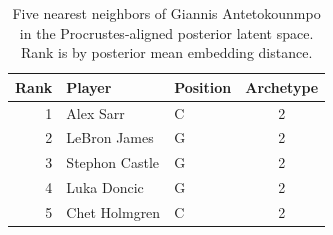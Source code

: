 \begin{table}[htbp]
  \centering\small
  \begin{tabular}{rllc}
    \toprule
    Rank & Player & Position & Archetype \\
    \midrule
    1 & Alex Sarr & C & 2 \\
    2 & LeBron James & G & 2 \\
    3 & Stephon Castle & G & 2 \\
    4 & Luka Doncic & G & 2 \\
    5 & Chet Holmgren & C & 2 \\
    \bottomrule
  \end{tabular}
  \caption{Five nearest neighbors of Giannis Antetokounmpo in the Procrustes-aligned posterior latent space. Rank is by posterior mean embedding distance.}
  \label{tab:Giannis_Antetokounmpo_neighbors}
\end{table}

